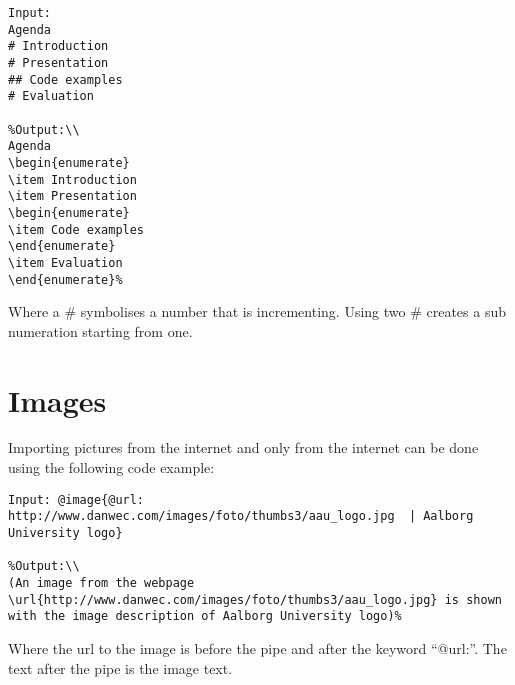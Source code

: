 \begin{lstlisting}[frame=single]
Input:
Agenda
# Introduction
# Presentation
## Code examples
# Evaluation

%Output:\\
Agenda
\begin{enumerate}
\item Introduction
\item Presentation
\begin{enumerate}
\item Code examples
\end{enumerate}
\item Evaluation
\end{enumerate}%
\end{lstlisting}

Where a \# symbolises a number that is incrementing. Using two \# creates a sub numeration starting from one.

\section{Images}
Importing pictures from the internet and only from the internet can be done using the following code example:

\begin{lstlisting}[frame=single]
Input: @image{@url: http://www.danwec.com/images/foto/thumbs3/aau_logo.jpg  | Aalborg University logo}

%Output:\\
(An image from the webpage \url{http://www.danwec.com/images/foto/thumbs3/aau_logo.jpg} is shown with the image description of Aalborg University logo)%
\end{lstlisting}

Where the url to the image is before the pipe and after the keyword ``@url:''. The text after the pipe is the image text.
